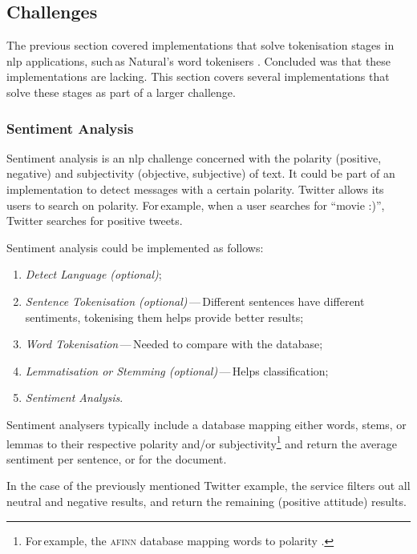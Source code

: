 \subsection{Challenges}\label{challenges}

The previous section covered implementations that solve tokenisation stages
  in \gls{nlp} applications, such\,as Natural's word
  tokenisers \autocite{NaturalNode/natural-source-code}.
Concluded was that these implementations are lacking.
This section covers several implementations that solve these stages
  as part of a larger challenge.

\subsubsection{Sentiment Analysis}\label{sentiment-analysis}

Sentiment analysis is an \gls{nlp} challenge concerned with the polarity
  (positive, negative) and subjectivity (objective, subjective) of text.
It could be part of an implementation to detect messages with a certain
  polarity.
Twitter allows its users to search on polarity.
For\,example, when a user searches for ``movie :)'', Twitter searches for
  positive tweets.

Sentiment analysis could be implemented as follows:

\begin{enumerate}
\item\emph{Detect Language (optional)};
\item\emph{Sentence Tokenisation (optional)}\,---\,Different sentences have
    different sentiments, tokenising them helps provide better results;
\item\emph{Word Tokenisation}\,---\,Needed to compare with the database;
\item\emph{Lemmatisation or Stemming (optional)}\,---\,Helps classification;
\item\emph{Sentiment Analysis}.
\end{enumerate}

\noindent Sentiment analysers typically include a
  database mapping either words, stems, or lemmas to their respective
  polarity and\slash or subjectivity\footnote{For\,example, the \textsc{afinn}
    database mapping words to polarity \autocite{nielsen-finn-arup-afinn}.}
  and return the average sentiment per sentence, or for the document.

In the case of the previously mentioned Twitter example, the service filters
  out all neutral and negative results, and return the remaining (positive
  attitude) results.

